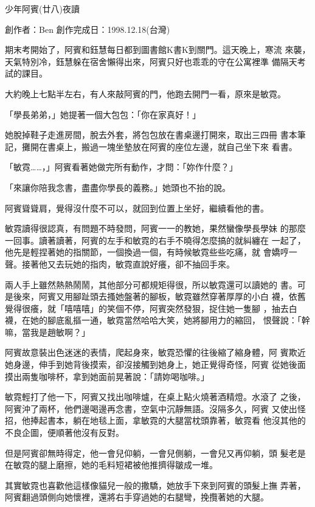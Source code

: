 



少年阿賓(廿八)夜讀

創作者：Ben
創作完成日：1998.12.18(台灣)


期末考開始了，阿賓和鈺慧每日都到圖書館K書K到關門。這天晚上，寒流
來襲，天氣特別冷，鈺慧躲在宿舍懶得出來，阿賓只好也乖乖的守在公寓裡準
備隔天考試的課目。

大約晚上七點半左右，有人來敲阿賓的門，他跑去開門一看，原來是敏霓。

「學長弟弟，」她提著一個大包包：「你在家真好！」

她脫掉鞋子走進房間，脫去外套，將包包放在書桌邊打開來，取出三四冊
書本筆記，攤開在書桌上，搬過一塊坐墊放在阿賓的座位左邊，就自己坐下來
看書。

「敏霓……，」阿賓看著她做完所有動作，才問：「妳作什麼？」

「來讓你陪我念書，盡盡你學長的義務。」她頭也不抬的說。

阿賓聳聳肩，覺得沒什麼不可以，就回到位置上坐好，繼續看他的書。

敏霓讀得很認真，有問題不時發問，阿賓一一的教她，果然蠻像學長學妹
的那麼一回事。讀著讀著，阿賓的左手和敏霓的右手不曉得怎麼搞的就糾纏在
一起了，他先是輕捏著她的指關節，一個換過一個，有時候敏霓些些吃痛，就
會嬌哼一聲。接著他又去玩她的指肉，敏霓直說好癢，卻不抽回手來。

兩人手上雖然熱熱鬧鬧，其他部分可都規矩得很，所以敏霓還可以讀她的
書。可是後來，阿賓又用腳趾頭去搔她盤著的腳板，敏霓雖然穿著厚厚的小白
襪，依舊覺得很癢，就「嘻嘻嘻」的笑個不停，阿賓突然發狠，捉住她一隻腳
，抽去白襪，在她的腳底亂摳一通，敏霓當然哈哈大笑，她將腳用力的縮回，
恨聲說：「幹嘛，當我是趙敏啊？」

阿賓故意裝出色迷迷的表情，爬起身來，敏霓恐懼的往後縮了縮身體，阿
賓欺近她身邊，伸手到她背後摸索，卻沒接觸到她身上，她正覺得奇怪，阿賓
從她後面摸出兩隻咖啡杯，拿到她面前晃著說：「請妳喝咖啡。」

敏霓輕打了他一下，阿賓又找出咖啡爐，在桌上點火燒著酒精燈。水滾了
之後，阿賓沖了兩杯，他們邊喝邊再念書，空氣中沉靜無語。沒隔多久，阿賓
又使出怪招，他捧起書本，躺在地毯上面，拿敏霓的大腿當枕頭靠著，敏霓看
他沒其他的不良企圖，便順著他沒有反對。

但是阿賓卻無時得定，他一會兒仰躺，一會兒側躺，一會兒又再仰躺，頭
髮老是在敏霓的腿上磨擦，她的毛料短裙被他推擠得皺成一堆。

其實敏霓也喜歡他這樣像貓兒一般的撒驕，她放手下來到阿賓的頭髮上撫
弄著，阿賓翻過頭側向她懷裡，還將右手穿過她的右腿彎，挽攬著她的大腿。

